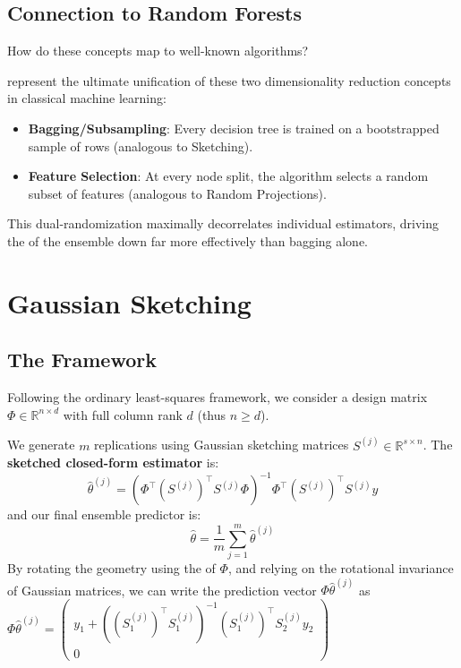 \documentclass[
11pt,notheorems,hyperref={pdfauthor=whatever}
]{beamer}
\begin{document}
\subsection{Connection to Random Forests}
\begin{frame}
    How do these concepts map to well-known algorithms?
    
     represent the ultimate unification of these two dimensionality reduction concepts in classical machine learning:
    \begin{itemize}
        \item \alert{\textbf{Bagging/Subsampling}}: Every decision tree is trained on a bootstrapped sample of rows (analogous to Sketching).
        \item \alert{\textbf{Feature Selection}}: At every node split, the algorithm selects a random subset of features (analogous to Random Projections).
    \end{itemize}
    This dual-randomization maximally decorrelates individual estimators, driving the  of the ensemble down far more effectively than bagging alone.
\end{frame}

\section{Gaussian Sketching}
\subsection{The Framework}
\begin{frame}
    Following the ordinary least-squares framework, we consider a design matrix \(\Phi \in \mathbb{R}^{n \times d}\) with full column rank \(d\) (thus \(n \ge d\)). 
    
    We generate \(m\) replications using Gaussian sketching matrices \(S^{(j)} \in \mathbb{R}^{s \times n}\). The \alert{\textbf{sketched closed-form estimator}} is:
    \[
        \hat{\theta}^{(j)} = (\Phi^\top(S^{(j)})^\top S^{(j)}\Phi)^{-1}\Phi^\top(S^{(j)})^\top S^{(j)}y
    \]
    and our final ensemble predictor is:
    \[
        \hat{\theta} = \frac{1}{m} \sum_{j=1}^m \hat{\theta}^{(j)}
    \]
    By rotating the geometry using the  of \(\Phi\), and relying on the rotational invariance of Gaussian matrices, we can write the prediction vector \(\Phi \hat \theta^{(j)}\) as \\
    \(\Phi \hat \theta^{(j)} = \begin{pmatrix} y_1 + ((S_1^{(j)})^\top S_1^{(j)})^{-1}(S_1^{(j)})^\top S_2^{(j)} y_2 \\ 0 \end{pmatrix}\)
\end{frame}
\end{document}
